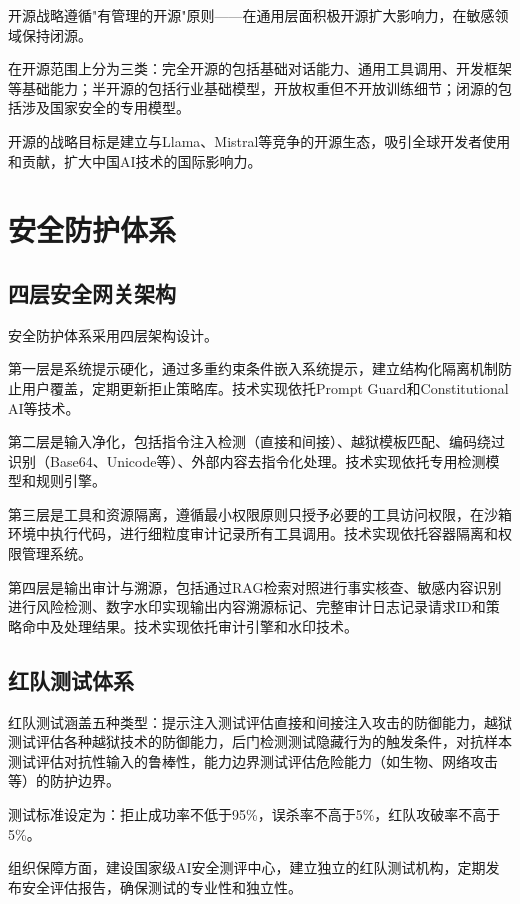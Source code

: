 开源战略遵循"有管理的开源"原则——在通用层面积极开源扩大影响力，在敏感领域保持闭源。

在开源范围上分为三类：完全开源的包括基础对话能力、通用工具调用、开发框架等基础能力；半开源的包括行业基础模型，开放权重但不开放训练细节；闭源的包括涉及国家安全的专用模型。

开源的战略目标是建立与Llama、Mistral等竞争的开源生态，吸引全球开发者使用和贡献，扩大中国AI技术的国际影响力。

\section{安全防护体系}

\subsection{四层安全网关架构}

安全防护体系采用四层架构设计。

第一层是系统提示硬化，通过多重约束条件嵌入系统提示，建立结构化隔离机制防止用户覆盖，定期更新拒止策略库。技术实现依托Prompt Guard和Constitutional AI等技术。

第二层是输入净化，包括指令注入检测（直接和间接）、越狱模板匹配、编码绕过识别（Base64、Unicode等）、外部内容去指令化处理。技术实现依托专用检测模型和规则引擎。

第三层是工具和资源隔离，遵循最小权限原则只授予必要的工具访问权限，在沙箱环境中执行代码，进行细粒度审计记录所有工具调用。技术实现依托容器隔离和权限管理系统。

第四层是输出审计与溯源，包括通过RAG检索对照进行事实核查、敏感内容识别进行风险检测、数字水印实现输出内容溯源标记、完整审计日志记录请求ID和策略命中及处理结果。技术实现依托审计引擎和水印技术。

\subsection{红队测试体系}

红队测试涵盖五种类型：提示注入测试评估直接和间接注入攻击的防御能力，越狱测试评估各种越狱技术的防御能力，后门检测测试隐藏行为的触发条件，对抗样本测试评估对抗性输入的鲁棒性，能力边界测试评估危险能力（如生物、网络攻击等）的防护边界。

测试标准设定为：拒止成功率不低于95\%，误杀率不高于5\%，红队攻破率不高于5\%。

组织保障方面，建设国家级AI安全测评中心，建立独立的红队测试机构，定期发布安全评估报告，确保测试的专业性和独立性。

